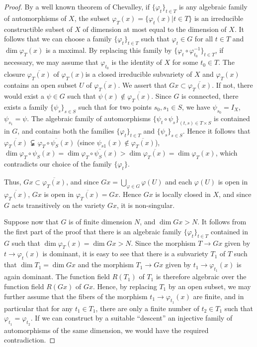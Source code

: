 \begin{proof}
By a well known theorem of Chevalley, if $\{\varphi_t\}_{t \in T}$ is any algebraic family of automorphisms of $X$, the subset $\varphi_T (x) = \{ \varphi_t (x) | t \in T\}$ is an irreducible constructible subset of $X$ of dimension at most equal to the dimension of $X$. It follows that we can choose a family $\{\varphi_t \}_{t \in T}$ such that $\varphi_t \in G$ for all $t \in T$ and $\dim \varphi_T (x)$ is a maximal. By replacing this family by $\{\varphi_t \circ \varphi^{-1}_{t_0}\}_{t \in T}$, if necessary, we may assume that $\varphi_{t_0}$  is the identity of $X$ for some $t_0 \in T$. The closure $\overline{\varphi_T (x)}$ of $\varphi_T (x)$\pageoriginale is a closed irreducible subvariety of $X$ and $\varphi_T (x)$ contains an open subset $U$ of $\overline{\varphi_T(x)}$. We assert that $G x \subset \overline{\varphi_T (x)}$. If not, there would exist a $\psi \in G$ such that $\psi(x) \not\in \overline{\varphi_T(x)}$. Since $G$ is connected, there exists a family $\{\psi_s\}_{s \in S}$ such that for two points $s_0, s_1 \in S$, we have $\psi_{s_0} = I_X$, $\psi_{s_1} = \psi$. The algebraic family of automorphisms $\{\psi_t \circ \psi_s\}_{(t,s) \in T \times S}$ is contained in $G$, and contains both the families $\{\varphi_t\}_{t \in T}$ and $\{\psi_s\}_{s \in S}$. Hence it follows that $\overline{\varphi_T (x)}$ $\varsubsetneqq$ $\overline{\varphi_T \circ \psi_S (x)}$ (since $\psi_{s1} (x) \not\in \overline{\varphi_T (x)}$), $\dim \varphi_T \circ \psi_S (x) = \dim \overline{\varphi_T \circ \psi_S (x)} >  \dim \overline{\varphi_T (x)} = \dim \varphi_T (x)$, which contradicts our choice of the family $\{\varphi_t\}$.

Thus, $G x \subset \overline{\varphi_T (x)}$, and since $G x = \bigcup\limits_{\varphi \in G} \varphi (U)$ and each $\varphi (U)$ is open in $\overline{\varphi_T (x)}$, $Gx$ is open in $\overline{\varphi_T (x)} = Gx$. Hence $Gx$ is locally closed in $X$, and since $G$ acts transitively on the variety $Gx$, it is non-singular.

Suppose now that $G$ is of finite dimension $N$, and $\dim G x > N$. It follows from the first part of the proof that there is an algebraic family $\{\varphi_t\}_{t \in T}$ contained in $G$ such that $\dim \varphi_T (x) = \dim G x > N$. Since the morphism $T \to G x$ given by $t \to \varphi_t (x)$ is dominant, it is easy to see that there is a subvariety $T_1$ of $T$ such that $\dim T_1 = \dim Gx$ and the morphism $T_1 \to Gx$ given by $t_1 \to \varphi_{t_1} (x)$ is again dominant. The function field $R(T_1)$ of $T_1$ is therefore algebraic over the function field $R (Gx)$ of $Gx$. Hence, by replacing $T_1$ by an open subset, we may further assume that the fibers of the morphism $t_1 \to \varphi_{t_1} (x)$ are finite, and in particular that for any $t_1 \in T_1$, there are only a finite number of $t_2 \in T_1$ such that $\varphi_{t_1} = \varphi_{t_2}$. If we can construct by a suitable ``descent'' an injective family of automorphisms of the same dimension, we would have the required contradiction.


\end{proof}
